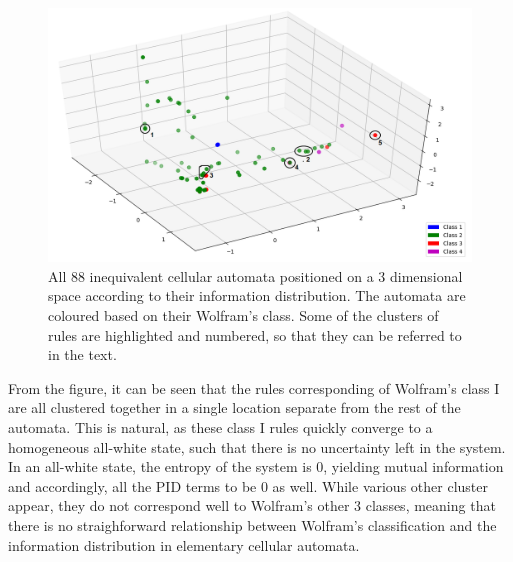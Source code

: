 \documentclass[12pt]{article}
\begin{document}
\begin{figure} [!h]
\begin{center}
\includegraphics[width=.9\textwidth]{eca-pid-characterization}
\caption{All 88 inequivalent cellular automata positioned on a 3 dimensional space according to their information distribution. The automata are coloured based on their Wolfram's class. Some of the clusters of rules are highlighted and numbered, so that they can be referred to in the text.}
\label{fig:eca-pid-char}
\end{center}
\end{figure}

From the figure, it can be seen that the rules corresponding of Wolfram's class I are all clustered together in a single location separate from the rest of the automata. This is natural, as these class I rules quickly converge to a homogeneous all-white state, such that there is no uncertainty left in the system. In an all-white state, the entropy of the system is 0, yielding mutual information and accordingly, all the PID terms to be 0 as well. While various other cluster appear, they do not correspond well to Wolfram's other 3 classes, meaning that there is no straighforward relationship between Wolfram's classification and the information distribution in elementary cellular automata. 
\end{document}
